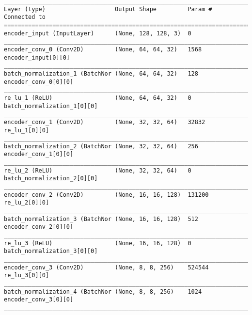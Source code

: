 \begin{lstlisting}[caption={\textsc{Mnist}-\ac{VAE} Encoder},captionpos=b,basicstyle=\tiny, label={lst:mnist-vae-encoder}]
__________________________________________________________________________________________________
Layer (type)                    Output Shape         Param #     Connected to
==================================================================================================
encoder_input (InputLayer)      (None, 128, 128, 3)  0
__________________________________________________________________________________________________
encoder_conv_0 (Conv2D)         (None, 64, 64, 32)   1568        encoder_input[0][0]
__________________________________________________________________________________________________
batch_normalization_1 (BatchNor (None, 64, 64, 32)   128         encoder_conv_0[0][0]
__________________________________________________________________________________________________
re_lu_1 (ReLU)                  (None, 64, 64, 32)   0           batch_normalization_1[0][0]
__________________________________________________________________________________________________
encoder_conv_1 (Conv2D)         (None, 32, 32, 64)   32832       re_lu_1[0][0]
__________________________________________________________________________________________________
batch_normalization_2 (BatchNor (None, 32, 32, 64)   256         encoder_conv_1[0][0]
__________________________________________________________________________________________________
re_lu_2 (ReLU)                  (None, 32, 32, 64)   0           batch_normalization_2[0][0]
__________________________________________________________________________________________________
encoder_conv_2 (Conv2D)         (None, 16, 16, 128)  131200      re_lu_2[0][0]
__________________________________________________________________________________________________
batch_normalization_3 (BatchNor (None, 16, 16, 128)  512         encoder_conv_2[0][0]
__________________________________________________________________________________________________
re_lu_3 (ReLU)                  (None, 16, 16, 128)  0           batch_normalization_3[0][0]
__________________________________________________________________________________________________
encoder_conv_3 (Conv2D)         (None, 8, 8, 256)    524544      re_lu_3[0][0]
__________________________________________________________________________________________________
batch_normalization_4 (BatchNor (None, 8, 8, 256)    1024        encoder_conv_3[0][0]
__________________________________________________________________________________________________

\end{lstlisting}
